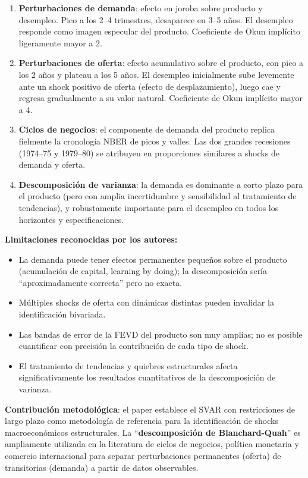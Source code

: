 \documentclass[12pt]{article}
\begin{document}
\begin{enumerate}
  \item \textbf{Perturbaciones de demanda}: efecto en joroba sobre producto y desempleo. Pico a los 2--4 trimestres, desaparece en 3--5 a\~nos. El desempleo responde como imagen especular del producto. Coeficiente de Okun impl\'icito ligeramente mayor a 2.

  \item \textbf{Perturbaciones de oferta}: efecto acumulativo sobre el producto, con pico a los 2 a\~nos y plateau a los 5 a\~nos. El desempleo inicialmente sube levemente ante un shock positivo de oferta (efecto de desplazamiento), luego cae y regresa gradualmente a su valor natural. Coeficiente de Okun impl\'icito mayor a 4.

  \item \textbf{Ciclos de negocios}: el componente de demanda del producto replica fielmente la cronolog\'ia NBER de picos y valles. Las dos grandes recesiones (1974--75 y 1979--80) se atribuyen en proporciones similares a shocks de demanda y oferta.

  \item \textbf{Descomposici\'on de varianza}: la demanda es dominante a corto plazo para el producto (pero con amplia incertidumbre y sensibilidad al tratamiento de tendencias), y robustamente importante para el desempleo en todos los horizontes y especificaciones.
\end{enumerate}

\textbf{Limitaciones reconocidas por los autores:}
\begin{itemize}
  \item La demanda puede tener efectos permanentes peque\~nos sobre el producto (acumulaci\'on de capital, learning by doing); la descomposici\'on ser\'ia ``aproximadamente correcta'' pero no exacta.
  \item M\'ultiples shocks de oferta con din\'amicas distintas pueden invalidar la identificaci\'on bivariada.
  \item Las bandas de error de la FEVD del producto son muy amplias; no es posible cuantificar con precisi\'on la contribuci\'on de cada tipo de shock.
  \item El tratamiento de tendencias y quiebres estructurales afecta significativamente los resultados cuantitativos de la descomposici\'on de varianza.
\end{itemize}

\textbf{Contribuci\'on metodol\'ogica}: el paper establece el SVAR con restricciones de largo plazo como metodolog\'ia de referencia para la identificaci\'on de shocks macroecon\'omicos estructurales. La ``\textbf{descomposici\'on de Blanchard-Quah}'' es ampliamente utilizada en la literatura de ciclos de negocios, pol\'itica monetaria y comercio internacional para separar perturbaciones permanentes (oferta) de transitorias (demanda) a partir de datos observables.
\end{document}
